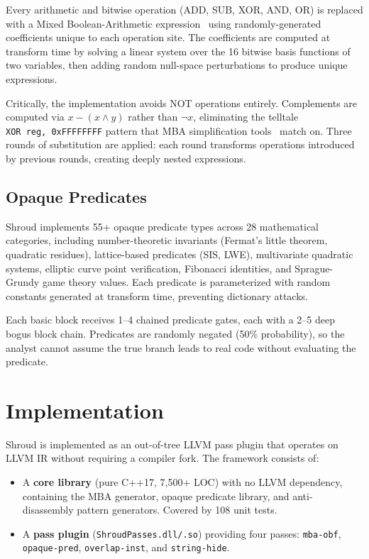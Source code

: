 \documentclass[letterpaper,twocolumn,10pt]{article}
\begin{document}
Every arithmetic and bitwise operation (ADD, SUB, XOR, AND, OR) is replaced with a Mixed Boolean-Arithmetic expression~\cite{eyrolles17} using randomly-generated coefficients unique to each operation site. The coefficients are computed at transform time by solving a linear system over the 16 bitwise basis functions of two variables, then adding random null-space perturbations to produce unique expressions.

Critically, the implementation avoids NOT operations entirely. Complements are computed via $x - (x \wedge y)$ rather than $\neg x$, eliminating the telltale \texttt{XOR~reg,~0xFFFFFFFF} pattern that MBA simplification tools~\cite{xu23} match on. Three rounds of substitution are applied: each round transforms operations introduced by previous rounds, creating deeply nested expressions.

\subsection{Opaque Predicates}

Shroud implements 55+ opaque predicate types across 28 mathematical categories, including number-theoretic invariants (Fermat's little theorem, quadratic residues), lattice-based predicates (SIS, LWE), multivariate quadratic systems, elliptic curve point verification, Fibonacci identities, and Sprague-Grundy game theory values. Each predicate is parameterized with random constants generated at transform time, preventing dictionary attacks.

Each basic block receives 1--4 chained predicate gates, each with a 2--5 deep bogus block chain. Predicates are randomly negated (50\% probability), so the analyst cannot assume the true branch leads to real code without evaluating the predicate.

\section{Implementation}
\label{sec:impl}

Shroud is implemented as an out-of-tree LLVM pass plugin that operates on LLVM IR without requiring a compiler fork. The framework consists of:

\begin{itemize}
\item A \textbf{core library} (pure C++17, 7,500+ LOC) with no LLVM dependency, containing the MBA generator, opaque predicate library, and anti-disassembly pattern generators. Covered by 108 unit tests.
\item A \textbf{pass plugin} (\texttt{ShroudPasses.dll/.so}) providing four passes: \texttt{mba-obf}, \texttt{opaque-pred}, \texttt{overlap-inst}, and \texttt{string-hide}.
\end{itemize}
\end{document}
